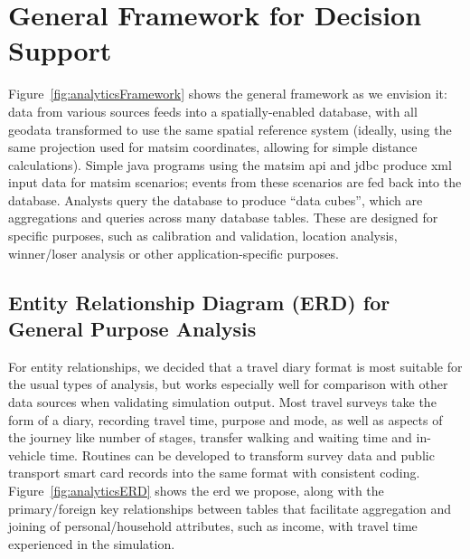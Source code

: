 \section{General Framework for Decision Support}
Figure~\ref{fig:analyticsFramework} shows the general framework as we envision it: data from various sources feeds into a spatially-enabled database, with all geodata transformed to use the same spatial reference system (ideally, using the same projection used for \gls{matsim} coordinates, allowing for simple distance calculations). Simple \gls{java} programs using the \gls{matsim} \gls{api} and \gls{jdbc} produce \gls{xml} input data for \gls{matsim} scenarios; events from these scenarios are fed back into the database. Analysts query the database to produce ``data cubes'', which are aggregations and queries across many database tables. These are designed for specific purposes, such as calibration and validation, location analysis, winner/loser analysis or other application-specific purposes.

\subsection{Entity Relationship Diagram (ERD) for General Purpose Analysis}
For entity relationships, we decided that a travel diary format is most suitable for the usual types of analysis, but works especially well for comparison with other data sources when validating simulation output. Most travel surveys take the form of a diary, recording travel time, purpose and mode, as well as aspects of the journey like number of stages, transfer walking and waiting time and in-vehicle time. Routines can be developed to transform survey data and public transport smart card records into the same format with consistent coding. Figure~\ref{fig:analyticsERD} shows the \gls{erd} we propose, along with the primary/foreign key relationships between tables that facilitate aggregation and joining of \eg personal/household attributes, such as income, with travel time experienced in the simulation.

